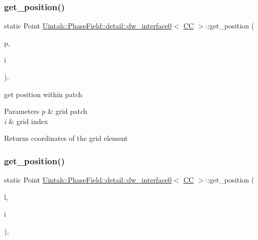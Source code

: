 \subsubsection{\texorpdfstring{get\+\_\+position()}{get\_position()}\hspace{0.1cm}{\footnotesize\ttfamily [1/2]}}
{\footnotesize\ttfamily static Point \hyperlink{classUintah_1_1PhaseField_1_1detail_1_1dw__interface0}{Uintah\+::\+Phase\+Field\+::detail\+::dw\+\_\+interface0}$<$ \hyperlink{namespaceUintah_1_1PhaseField_a33d355affda78a83f45755ba8388cedda22303704507d024d1d6508ed9859a85a}{CC} $>$\+::get\+\_\+position (\begin{DoxyParamCaption}\item[{const Patch $\ast$}]{p,  }\item[{const Int\+Vector \&}]{i }\end{DoxyParamCaption})\hspace{0.3cm}{\ttfamily [inline]}, {\ttfamily [static]}}



get position within patch 


\begin{DoxyParams}{Parameters}
{\em p} & grid patch \\
\hline
{\em i} & grid index \\
\hline
\end{DoxyParams}
\begin{DoxyReturn}{Returns}
coordinates of the grid element 
\end{DoxyReturn}
\mbox{\label{classUintah_1_1PhaseField_1_1detail_1_1dw__interface0_3_01CC_01_4_a0dd7b14ca510edbf480c3a54f92f978c}} 
\subsubsection{\texorpdfstring{get\+\_\+position()}{get\_position()}\hspace{0.1cm}{\footnotesize\ttfamily [2/2]}}
{\footnotesize\ttfamily static Point \hyperlink{classUintah_1_1PhaseField_1_1detail_1_1dw__interface0}{Uintah\+::\+Phase\+Field\+::detail\+::dw\+\_\+interface0}$<$ \hyperlink{namespaceUintah_1_1PhaseField_a33d355affda78a83f45755ba8388cedda22303704507d024d1d6508ed9859a85a}{CC} $>$\+::get\+\_\+position (\begin{DoxyParamCaption}\item[{const Level $\ast$}]{l,  }\item[{const Int\+Vector \&}]{i }\end{DoxyParamCaption})\hspace{0.3cm}{\ttfamily [inline]}, {\ttfamily [static]}}



